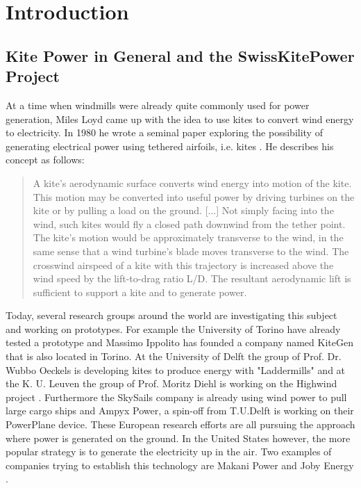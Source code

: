 \chapter{Introduction}\label{cha1}
\section{Kite Power in General and the SwissKitePower Project}
At a time when windmills were already quite commonly used for power generation, Miles Loyd came up with the idea to use kites to convert wind energy to electricity.  In 1980 he wrote a seminal paper exploring the possibility of generating electrical power using tethered airfoils, i.e. kites \cite{loyd1980}. He describes his concept as follows:
\begin{quote} A kite's aerodynamic surface converts wind energy into motion of the kite. This motion may be converted into useful
power by driving turbines on the kite or by pulling a load on the ground. [...] Not simply facing into the wind, such kites would fly a closed path downwind from the tether point. The kite's motion would be approximately transverse to the wind, in the same sense that a wind turbine's blade moves transverse to the wind. The crosswind airspeed of a kite with this trajectory is increased above the wind speed by the lift-to-drag ratio L/D. The resultant aerodynamic lift is sufficient to support a kite and to generate power. \cite{loyd1980}\end{quote}
Today, several research groups around the world are investigating this subject and working on prototypes. For example the University of Torino have already tested a prototype \cite{canale2006} and Massimo Ippolito has founded a company named KiteGen that is also located in Torino. At the University of Delft the group of Prof. Dr. Wubbo Oeckels is developing kites to produce energy with "Laddermills" \cite{schmehl2012} and at the K. U. Leuven the group of Prof. Moritz Diehl is working on the Highwind project \cite{geebelen2012}. Furthermore the SkySails company is already using wind power to pull large cargo ships \cite{erhard2012} and Ampyx Power, a spin-off from T.U.Delft is working on their PowerPlane device. These European research efforts are all pursuing the approach where power is generated on the ground. In the United States however, the more popular strategy is to generate the electricity up in the air. Two examples of companies trying to establish this technology are Makani Power \cite{makani} and Joby Energy \cite{joby}.  

